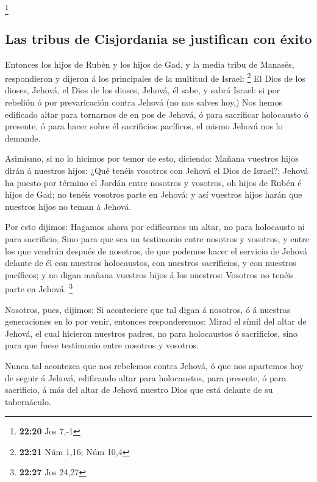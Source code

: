 \footnote{\textbf{22:20} Jos 7,-1}

\hypertarget{las-tribus-de-cisjordania-se-justifican-con-uxe9xito}{%
\subsection{Las tribus de Cisjordania se justifican con
éxito}\label{las-tribus-de-cisjordania-se-justifican-con-uxe9xito}}

 Entonces los hijos de Rubén y los hijos de Gad, y la media
tribu de Manasés, respondieron y dijeron á los principales de la
multitud de Israel: \footnote{\textbf{22:21} Núm 1,16; Núm 10,4}
 El Dios de los dioses, Jehová, el Dios de los dioses,
Jehová, él sabe, y sabrá Israel: si por rebelión ó por prevaricación
contra Jehová (no nos salves hoy,)  Nos hemos edificado
altar para tornarnos de en pos de Jehová, ó para sacrificar holocausto ó
presente, ó para hacer sobre él sacrificios pacíficos, el mismo Jehová
nos lo demande.

 Asimismo, si no lo hicimos por temor de esto, diciendo:
Mañana vuestros hijos dirán á nuestros hijos: ¿Qué tenéis vosotros con
Jehová el Dios de Israel?;  Jehová ha puesto por término el
Jordán entre nosotros y vosotros, oh hijos de Rubén é hijos de Gad; no
tenéis vosotros parte en Jehová: y así vuestros hijos harán que nuestros
hijos no teman á Jehová.

 Por esto dijimos: Hagamos ahora por edificarnos un altar,
no para holocausto ni para sacrificio,  Sino para que sea
un testimonio entre nosotros y vosotros, y entre los que vendrán después
de nosotros, de que podemos hacer el servicio de Jehová delante de él
con nuestros holocaustos, con nuestros sacrificios, y con nuestros
pacíficos; y no digan mañana vuestros hijos á los nuestros: Vosotros no
tenéis parte en Jehová. \footnote{\textbf{22:27} Jos 24,27}

 Nosotros, pues, dijimos: Si aconteciere que tal digan á
nosotros, ó á nuestras generaciones en lo por venir, entonces
responderemos: Mirad el símil del altar de Jehová, el cual hicieron
nuestros padres, no para holocaustos ó sacrificios, sino para que fuese
testimonio entre nosotros y vosotros.

 Nunca tal acontezca que nos rebelemos contra Jehová, ó que
nos apartemos hoy de seguir á Jehová, edificando altar para holocaustos,
para presente, ó para sacrificio, á más del altar de Jehová nuestro Dios
que está delante de su tabernáculo.

